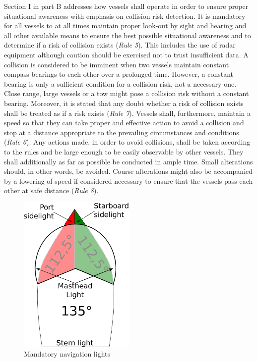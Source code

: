 Section I in part B addresses how vessels shall operate in order to ensure proper situational awareness with emphasis on collision risk detection.
It is mandatory for  all vessels to at all times maintain proper look-out by sight and hearing and all other available means to ensure the best possible situational awareness and  to determine if a risk of collision exists (\textit{Rule 5}).
This includes the use of radar equipment although caution should be exercised not to trust insufficient data.
A collision is considered to be imminent when two vessels maintain constant compass bearings to each other over a prolonged time.
However, a constant bearing is only a sufficient condition for a collision risk, not a necessary one. Close range, large vessels or a tow might pose a collision risk without a constant bearing. Moreover, it is stated that any doubt whether a risk of collision exists shall be treated as if a risk exists (\textit{Rule 7}).
Vessels shall, furthermore, maintain a speed so that they can take proper and effective action to avoid a collision and stop at a distance appropriate to the prevailing circumstances and conditions (\textit{Rule 6}). Any actions made, in order to avoid collisions, shall be taken according to the rules and be large enough to be easily observable by other vessels. They shall additionally as far as possible be conducted in ample time. Small alterations should, in other words, be avoided. Course alterations might also be accompanied by a lowering of speed if considered necessary to ensure that the vessels pass each other at safe distance (\textit{Rule 8}).
\begin{figure}
    \centering
    \includegraphics[width=0.5\textwidth,height=0.5\textheight,keepaspectratio]{Figures/lights.eps}
    \caption{Mandatory navigation lights}
    \label{fig:nav_lights}
\end{figure}



